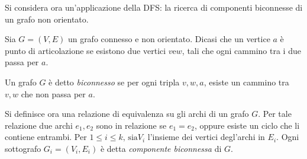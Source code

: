\documentclass{subfiles}
\begin{document}
Si considera ora un'applicazione della DFS: la ricerca di componenti biconnesse di un grafo non orientato.

\begin{Definition*}
    Sia \(G = (V, E)\) un grafo connesso e non orientato. Dicasi che un vertice \(a\) è punto di articolazione se esistono due vertici \(v \text{e} w\),
    tali che ogni cammino tra i due passa per \(a\).
\end{Definition*}
\begin{Definition*}
    Un grafo \(G\) è detto \emph{biconnesso} se per ogni tripla \(v,w,a\), esiste un cammino tra \(v, w\) che non passa per \(a\).
\end{Definition*}

\noindent Si definisce ora una relazione di equivalenza su gli archi di un grafo \(G\).
Per tale relazione due archi \(e_{1}, e_{2}\) sono in relazione se \(e_{1} = e_{2}\), oppure esiste un ciclo che li contiene entrambi.
Per \(1 \le i \le k \text{, sia} V_{i}\) l'insieme dei vertici degl'archi in \(E_{i}\).
Ogni sottografo \(G_{i} = (V_{i}, E_{i})\) è detta \emph{componente biconnessa} di \(G\).
\end{document}
